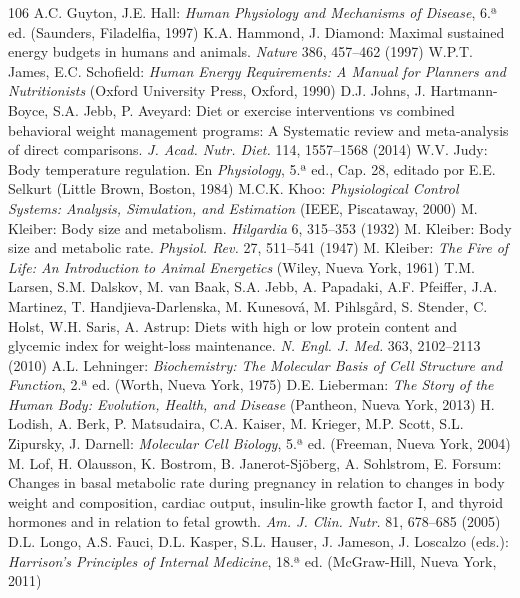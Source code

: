 \documentclass[12pt]{book}
\begin{document}
\begin{thebibliography}{106}
   A.C. Guyton, J.E. Hall: \textit{Human Physiology and Mechanisms of Disease}, 6.ª ed. (Saunders, Filadelfia, 1997)
   K.A. Hammond, J. Diamond: Maximal sustained energy budgets in humans and animals. \textit{Nature} 386, 457--462 (1997)
   W.P.T. James, E.C. Schofield: \textit{Human Energy Requirements: A Manual for Planners and Nutritionists} (Oxford University Press, Oxford, 1990)
   D.J. Johns, J. Hartmann-Boyce, S.A. Jebb, P. Aveyard: Diet or exercise interventions vs combined behavioral weight management programs: A Systematic review and meta-analysis of direct comparisons. \textit{J. Acad. Nutr. Diet.} 114, 1557--1568 (2014)
   W.V. Judy: Body temperature regulation. En \textit{Physiology}, 5.ª ed., Cap. 28, editado por E.E. Selkurt (Little Brown, Boston, 1984)
   M.C.K. Khoo: \textit{Physiological Control Systems: Analysis, Simulation, and Estimation} (IEEE, Piscataway, 2000)
   M. Kleiber: Body size and metabolism. \textit{Hilgardia} 6, 315--353 (1932)
   M. Kleiber: Body size and metabolic rate. \textit{Physiol. Rev.} 27, 511--541 (1947)
   M. Kleiber: \textit{The Fire of Life: An Introduction to Animal Energetics} (Wiley, Nueva York, 1961)
   T.M. Larsen, S.M. Dalskov, M. van Baak, S.A. Jebb, A. Papadaki, A.F. Pfeiffer, J.A. Martinez, T. Handjieva-Darlenska, M. Kunesová, M. Pihlsgård, S. Stender, C. Holst, W.H. Saris, A. Astrup: Diets with high or low protein content and glycemic index for weight-loss maintenance. \textit{N. Engl. J. Med.} 363, 2102--2113 (2010)
   A.L. Lehninger: \textit{Biochemistry: The Molecular Basis of Cell Structure and Function}, 2.ª ed. (Worth, Nueva York, 1975)
   D.E. Lieberman: \textit{The Story of the Human Body: Evolution, Health, and Disease} (Pantheon, Nueva York, 2013)
   H. Lodish, A. Berk, P. Matsudaira, C.A. Kaiser, M. Krieger, M.P. Scott, S.L. Zipursky, J. Darnell: \textit{Molecular Cell Biology}, 5.ª ed. (Freeman, Nueva York, 2004)
   M. Lof, H. Olausson, K. Bostrom, B. Janerot-Sjöberg, A. Sohlstrom, E. Forsum: Changes in basal metabolic rate during pregnancy in relation to changes in body weight and composition, cardiac output, insulin-like growth factor I, and thyroid hormones and in relation to fetal growth. \textit{Am. J. Clin. Nutr.} 81, 678--685 (2005)
   D.L. Longo, A.S. Fauci, D.L. Kasper, S.L. Hauser, J. Jameson, J. Loscalzo (eds.): \textit{Harrison's Principles of Internal Medicine}, 18.ª ed. (McGraw-Hill, Nueva York, 2011)

\end{thebibliography}
\end{document}
